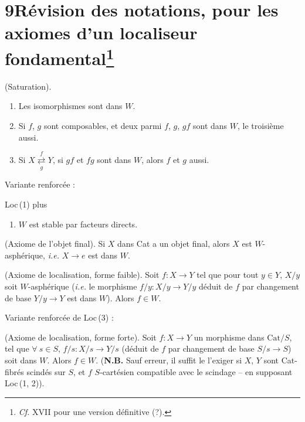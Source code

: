 \documentclass[11pt]{article}
\newcommand{\msp}[1]{\marginpar{\raggedright\footnotesize [#1]}}
\begin{document}
\msp{page 116}

\section*{9\quad Révision des notations, pour les axiomes d'un localiseur fondamental\footnote[43]{\textit{Cf.} XVII pour une version définitive (?).}}

\begin{description}[style=sameline,leftmargin=6.5em]
\item[Loc\,(1)] (Saturation).
\begin{enumerate}[leftmargin=2.5em]
\item[$a$)] Les isomorphismes sont dans $W$.
\item[$b$)] Si $f$, $g$ sont composables, et deux parmi $f$, $g$, $gf$ sont dans $W$, le troisième aussi.
\item[$c$)] Si $X \underset{g}{\overset{f}{\rightleftarrows}} Y$, si $gf$ et $fg$ sont dans $W$, alors $f$ et $g$ aussi.
\end{enumerate}
\end{description}
\noindent Variante renforcée :
\begin{description}[style=sameline,leftmargin=6.5em]
\item[Loc\,(1\,bis)] Loc\,(1) plus
\begin{enumerate}[leftmargin=2.5em]
\item[$d$)] $W$ est stable par facteurs directs.
\end{enumerate}
\item[Loc\,(2)] (Axiome de l'objet final). Si $X$ dans Cat a un objet final, alors $X$ est $W$-asphérique, \textit{i.e.} $X \longrightarrow e$ est dans $W$.
\item[Loc\,(3)] (Axiome de localisation, forme faible). Soit $f : X \longrightarrow Y$ tel que pour tout $y \in Y$, $X/y$ soit $W$-asphérique (\textit{i.e.} le morphisme $f/y : X/y \longrightarrow Y/y$ déduit de $f$ par changement de base $Y/y \longrightarrow Y$ est dans $W$). Alors $f \in W$.
\end{description}
\noindent Variante renforcée de Loc\,(3) :
\begin{description}[style=sameline,leftmargin=6.5em]
\item[Loc\,(3\,bis)] (Axiome de localisation, forme forte). Soit $f : X \longrightarrow Y$ un morphisme dans $\mathrm{Cat}/S$, tel que $\forall\ s \in S$, $f/s : X/s \longrightarrow Y/s$ (déduit de $f$ par changement de base $S/s \longrightarrow S$) soit dans $W$. Alors $f \in W$. (\textbf{N.B.} Sauf erreur, il suffit le l'exiger si $X$, $Y$ sont Cat-fibrés scindés sur $S$, et $f$ $S$-cartésien compatible avec le scindage – en supposant Loc\,(1, 2)). %
\end{description}
\end{document}
